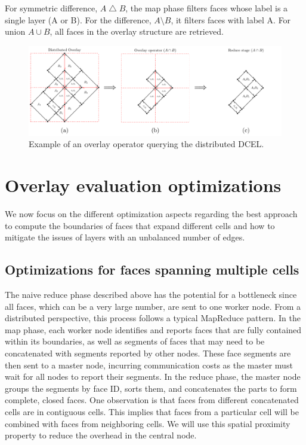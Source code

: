 For symmetric difference, $A \bigtriangleup B$, the map phase filters faces whose label is a single layer (A or B). For the difference, $A \setminus B$, it filters faces with label A. For union $A \cup B$, all faces in the overlay structure are retrieved. 

\begin{figure}
    \centering
    \includegraphics[width=\linewidth]{chapter2/overlay_operator.pdf}    
    \caption{Example of an overlay operator querying the distributed DCEL.} \label{fig:overlay_operator}
\end{figure}

\section{Overlay evaluation optimizations}\label{sec:alternative_methods}
We now focus on the different optimization aspects regarding the best approach to compute the boundaries of faces that expand different cells and how to mitigate the issues of layers with an unbalanced number of edges.

\subsection{Optimizations for faces spanning multiple cells}\label{sec:optimizing}

The naive reduce phase described above has the potential for a bottleneck since all faces, which can be a very large number, are sent to one worker node. 
From a distributed perspective, this process follows a typical MapReduce pattern. In the map phase, each worker node identifies and reports faces that are fully contained within its boundaries, as well as segments of faces that may need to be concatenated with segments reported by other nodes. These face segments are then sent to a master node, incurring communication costs as the master must wait for all nodes to report their segments. In the reduce phase, the master node groups the segments by face ID, sorts them, and concatenates the parts to form complete, closed faces.
One observation is that faces from different concatenated cells are in contiguous cells. This implies that faces from a particular cell will be combined with faces from neighboring cells. We will use this spatial proximity property to reduce the overhead in the central node.

